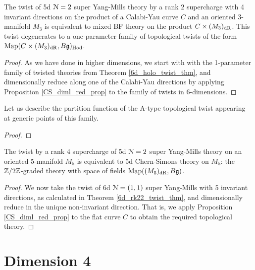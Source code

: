 \documentclass[10pt, oneside]{article}
\begin{document}
\begin{theorem} \label{5d_rk2_twist_thm}
The twist of 5d $\mathcal{N}=2$ super Yang-Mills theory by a rank $2$ supercharge with 4 invariant directions on the product of a Calabi-Yau curve $C$ and an oriented 3-manifold $M_3$ is equivalent to mixed BF theory on the product $C \times (M_3)_{\mathrm{dR}}$. This twist degenerates to a one-parameter family of topological twists of the form $\operatorname{Map}(C \times (M_3)_{\mathrm{dR}}, B\mathfrak{g})_{\mathrm{Hod}}$.
\end{theorem}

\begin{proof}
As we have done in higher dimensions, we start with with the 1-parameter family of twisted theories from Theorem \ref{6d_holo_twist_thm}, and dimensionally reduce along one of the Calabi-Yau directions by applying Proposition \ref{CS_diml_red_prop} to the family of twists in 6-dimensions.
\end{proof}

Let us describe the partition function of the A-type topological twist appearing at generic points of this family.  
\begin{theorem}
\end{theorem}

\begin{proof}
 
\end{proof}

\begin{theorem} \label{5d_rk4_twist_thm}
The twist by a rank $4$ supercharge of 5d $\mathcal{N}=2$ super Yang-Mills theory on an oriented 5-manifold $M_5$ is equivalent to 5d Chern-Simons theory on $M_5$: the $\mathbb Z/2\mathbb Z$-graded theory with space of fields $\mathrm{Map}((M_5)_{\mathrm{dR}}, B\mathfrak{g})$.
\end{theorem}

\begin{proof}
We now take the twist of 6d $\mathcal{N}=(1,1)$ super Yang-Mills with 5 invariant directions, as calculated in Theorem \ref{6d_rk22_twist_thm}, and dimensionally reduce in the unique non-invariant direction.  That is, we apply Proposition \ref{CS_diml_red_prop} to the flat curve $C$ to obtain the required topological theory.
\end{proof}
 
\section{Dimension 4}
\end{document}
